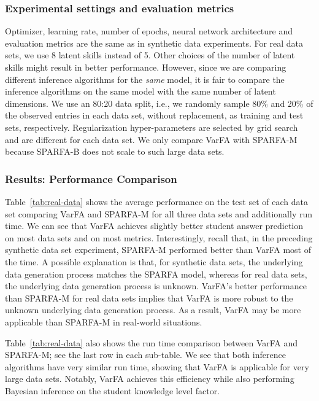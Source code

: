 \subsubsection*{Experimental settings and evaluation metrics} Optimizer, learning rate, number of epochs, neural network architecture and
evaluation metrics are the same as in synthetic data experiments. For real data
sets, we use 8 latent skills instead of 5. Other choices of the number of
latent skills might result in better performance. However, since we are
comparing different inference algorithms for the \textit{same} model, it is
fair to compare the inference algorithms on the same model with the same number
of latent dimensions.
We use an 80:20 data split, i.e., we randomly sample 80\% and 20\% of the
observed entries in each data set, without replacement, as training and test
sets, respectively. Regularization hyper-parameters are selected by grid search
and are different for each data set. We only compare VarFA with SPARFA-M
because SPARFA-B does not scale to such large data sets.
%
\subsubsection{Results: Performance Comparison}
Table~\ref{tab:real-data} shows the average performance on the test set of each
data set comparing VarFA and SPARFA-M for all three data sets and additionally
run time. We can see that VarFA achieves slightly better student answer
prediction on most data sets and on most metrics.
%
Interestingly, recall that, in the preceding synthetic data set experiment,
SPARFA-M performed better than VarFA most of the time. A possible explanation
is that, for synthetic data sets, the underlying data generation process
matches the SPARFA model, whereas for real data sets, the underlying data
generation process is unknown. VarFA's better performance than SPARFA-M for
real data sets implies that VarFA is more robust to the unknown underlying data
generation process. As a result, VarFA may be more applicable than SPARFA-M in
real-world situations.

Table~\ref{tab:real-data} also shows the run time comparison between VarFA and
SPARFA-M; see the last row in each sub-table. We see that both inference
algorithms have very similar run time, showing that VarFA is applicable for
very large data sets. Notably, VarFA achieves this efficiency while also
performing Bayesian inference on the student knowledge level factor.
% 
